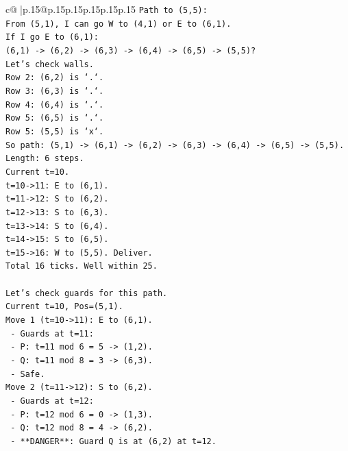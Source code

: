 \documentclass{article}
\begin{document}
{\begin{supertabular}{c@{$\;$}|p{.15\linewidth}@{}p{.15\linewidth}p{.15\linewidth}p{.15\linewidth}p{.15\linewidth}p{.15\linewidth}}
{{{\texttt{Path to (5,5):} \\
\texttt{From (5,1), I can go W to (4,1) or E to (6,1).} \\
\texttt{If I go E to (6,1):} \\
\texttt{(6,1) {-}> (6,2) {-}> (6,3) {-}> (6,4) {-}> (6,5) {-}> (5,5)?} \\
\texttt{Let's check walls.} \\
\texttt{Row 2: (6,2) is `.`.} \\
\texttt{Row 3: (6,3) is `.`.} \\
\texttt{Row 4: (6,4) is `.`.} \\
\texttt{Row 5: (6,5) is `.`.} \\
\texttt{Row 5: (5,5) is `x`.} \\
\texttt{So path: (5,1) {-}> (6,1) {-}> (6,2) {-}> (6,3) {-}> (6,4) {-}> (6,5) {-}> (5,5).} \\
\texttt{Length: 6 steps.} \\
\texttt{Current t=10.} \\
\texttt{t=10{-}>11: E to (6,1).} \\
\texttt{t=11{-}>12: S to (6,2).} \\
\texttt{t=12{-}>13: S to (6,3).} \\
\texttt{t=13{-}>14: S to (6,4).} \\
\texttt{t=14{-}>15: S to (6,5).} \\
\texttt{t=15{-}>16: W to (5,5). Deliver.} \\
\texttt{Total 16 ticks. Well within 25.} \\
\\ 
\texttt{Let's check guards for this path.} \\
\texttt{Current t=10, Pos=(5,1).} \\
\texttt{Move 1 (t=10{-}>11): E to (6,1).} \\
\texttt{  {-} Guards at t=11:} \\
\texttt{    {-} P: t=11 mod 6 = 5 {-}> (1,2).} \\
\texttt{    {-} Q: t=11 mod 8 = 3 {-}> (6,3).} \\
\texttt{  {-} Safe.} \\
\texttt{Move 2 (t=11{-}>12): S to (6,2).} \\
\texttt{  {-} Guards at t=12:} \\
\texttt{    {-} P: t=12 mod 6 = 0 {-}> (1,3).} \\
\texttt{    {-} Q: t=12 mod 8 = 4 {-}> (6,2).} \\
\texttt{  {-} **DANGER**: Guard Q is at (6,2) at t=12.} \\
}}}
\end{supertabular}}
\end{document}
